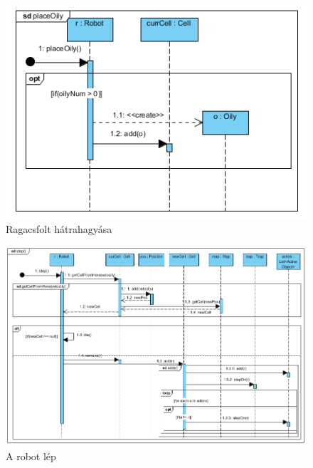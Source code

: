 \begin{figure}[!htbp]
	\begin{center}
		\includegraphics[width=166mm, center]{./vegleges_statikus_seq/placeoily.png}
		\caption{Ragacsfolt hátrahagyása}
	\end{center}
\end{figure}


\begin{figure}[!htbp]
	\begin{center}
		\includegraphics[width=166mm, center]{./vegleges_statikus_seq/step.png}
		\caption{A robot lép}
	\end{center}
\end{figure}

